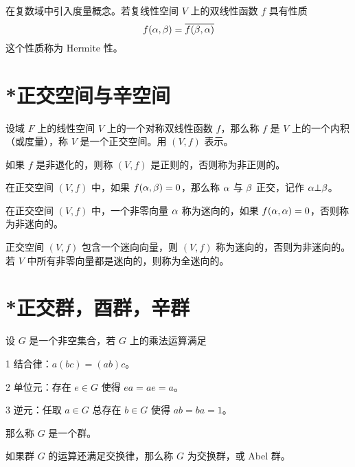 在复数域中引入度量概念。若复线性空间 $V$ 上的双线性函数 $f$ 具有性质
\[ f(\alpha,\beta) = \overline{f(\beta,\alpha)} \]
这个性质称为 Hermite 性。

\section{*正交空间与辛空间}

\begin{definition}
    设域 $F$ 上的线性空间 $V$ 上的一个对称双线性函数 $f$，那么称 $f$ 是 $V$ 上的一个内积（或度量），称 $V$ 是一个正交空间。用 $(V,f)$ 表示。
\end{definition}

如果 $f$ 是非退化的，则称 $(V,f)$ 是正则的，否则称为非正则的。

\begin{definition}
    在正交空间 $(V,f)$ 中，如果 $f(\alpha,\beta) = 0$，那么称 $\alpha$ 与 $\beta$ 正交，记作 $\alpha \bot \beta$。
\end{definition}

在正交空间 $(V,f)$ 中，一个非零向量 $\alpha$ 称为迷向的，如果 $f(\alpha,\alpha) = 0$，否则称为非迷向的。

正交空间 $(V,f)$ 包含一个迷向向量，则 $(V,f)$ 称为迷向的，否则为非迷向的。若 $V$ 中所有非零向量都是迷向的，则称为全迷向的。

\section{*正交群，酉群，辛群}

\begin{definition}
    设 $G$ 是一个非空集合，若 $G$ 上的乘法运算满足

    \num{1} 结合律：$a(bc) = (ab)c$。

    \num{2} 单位元：存在 $e \in G$ 使得 $ea = ae = a$。

    \num{3} 逆元：任取 $a \in G$ 总存在 $b \in G$ 使得 $ab = ba = 1$。

    那么称 $G$ 是一个群。
\end{definition}

如果群 $G$ 的运算还满足交换律，那么称 $G$ 为交换群，或 Abel 群。












